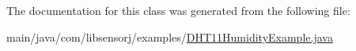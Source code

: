 The documentation for this class was generated from the following file\+:\begin{DoxyCompactItemize}
\item 
main/java/com/libsensorj/examples/\hyperlink{DHT11HumidityExample_8java}{D\+H\+T11\+Humidity\+Example.\+java}\end{DoxyCompactItemize}
